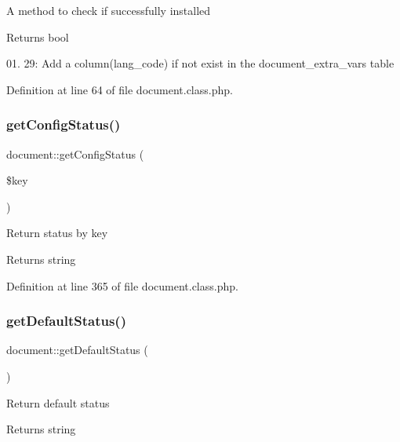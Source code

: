 A method to check if successfully installed \begin{DoxyReturn}{Returns}
bool 
\end{DoxyReturn}

\begin{DoxyEnumerate}
\item 01. 29\+: Add a column(lang\+\_\+code) if not exist in the document\+\_\+extra\+\_\+vars table
\end{DoxyEnumerate}

Definition at line 64 of file document.\+class.\+php.

\hypertarget{classdocument_a319eeb35de3ffef5cb32374283b7bf14}{}\label{classdocument_a319eeb35de3ffef5cb32374283b7bf14} 
\subsubsection{\texorpdfstring{get\+Config\+Status()}{getConfigStatus()}}
{\footnotesize\ttfamily document\+::get\+Config\+Status (\begin{DoxyParamCaption}\item[{}]{\$key }\end{DoxyParamCaption})}

Return status by key \begin{DoxyReturn}{Returns}
string 
\end{DoxyReturn}


Definition at line 365 of file document.\+class.\+php.

\hypertarget{classdocument_aacc6b168cae9bf79d7a13d6f5bb4fdfb}{}\label{classdocument_aacc6b168cae9bf79d7a13d6f5bb4fdfb} 
\subsubsection{\texorpdfstring{get\+Default\+Status()}{getDefaultStatus()}}
{\footnotesize\ttfamily document\+::get\+Default\+Status (\begin{DoxyParamCaption}{ }\end{DoxyParamCaption})}

Return default status \begin{DoxyReturn}{Returns}
string 
\end{DoxyReturn}


